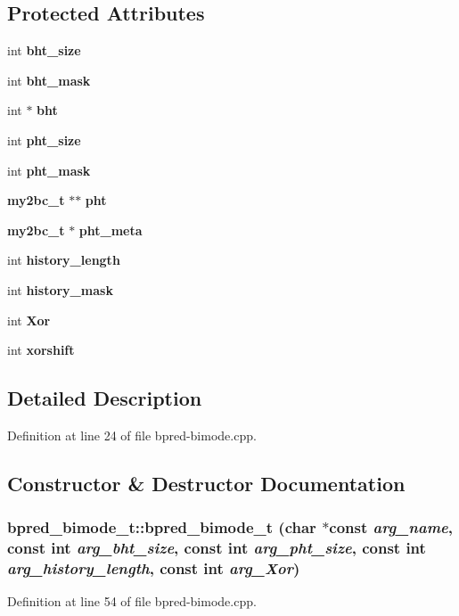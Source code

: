 \subsection*{Protected Attributes}
\begin{CompactItemize}
\item 
int {\bf bht\_\-size}
\item 
int {\bf bht\_\-mask}
\item 
int $\ast$ {\bf bht}
\item 
int {\bf pht\_\-size}
\item 
int {\bf pht\_\-mask}
\item 
{\bf my2bc\_\-t} $\ast$$\ast$ {\bf pht}
\item 
{\bf my2bc\_\-t} $\ast$ {\bf pht\_\-meta}
\item 
int {\bf history\_\-length}
\item 
int {\bf history\_\-mask}
\item 
int {\bf Xor}
\item 
int {\bf xorshift}
\end{CompactItemize}


\subsection{Detailed Description}


Definition at line 24 of file bpred-bimode.cpp.

\subsection{Constructor \& Destructor Documentation}
\subsubsection[{bpred\_\-bimode\_\-t}]{\setlength{\rightskip}{0pt plus 5cm}bpred\_\-bimode\_\-t::bpred\_\-bimode\_\-t (char $\ast$const  {\em arg\_\-name}, \/  const int {\em arg\_\-bht\_\-size}, \/  const int {\em arg\_\-pht\_\-size}, \/  const int {\em arg\_\-history\_\-length}, \/  const int {\em arg\_\-Xor})\hspace{0.3cm}{\tt  [inline]}}\label{classbpred__bimode__t_d751a5717eadeb48417f59edce3e70a7}




Definition at line 54 of file bpred-bimode.cpp.


